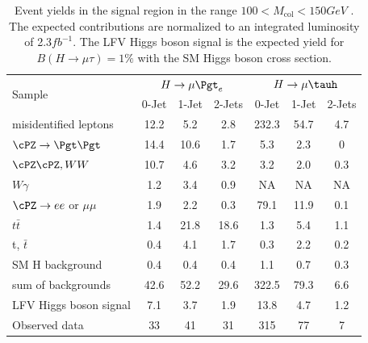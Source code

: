  \begin{table}[hbtp]
 \centering  \caption{Event yields in the signal region in the range $100 < M_\text{col} < 150GeV$ . The expected contributions are normalized to an integrated luminosity
of 2.3$fb^{-1}$. The LFV Higgs boson signal is the expected yield for $B(H \rightarrow \mu \tau)=1\%$ with the SM Higgs boson cross section.}
  \label{tab:EventYieldTable_100_to_150}
  \begin{tabular}{lccc|ccc} \hline
        \multirow{2}{*}{Sample}                                & \multicolumn{3}{c}{$H \rightarrow \mu \Pgt_{e}$}                &     \multicolumn{3}{c}{$H \rightarrow \mu \tauh$}     \\ \cline{2-7}
                                              &  0-Jet            & 1-Jet            & 2-Jets               &  0-Jet             & 1-Jet            & 2-Jets  \\ \hline
    misidentified leptons                    &  12.2  &   5.2     &  2.8 & 232.3 & 54.7 & 4.7 \\
    $ \cPZ \rightarrow \Pgt \Pgt$                    & 14.4   & 10.6      &  1.7 & 5.3   & 2.3  & 0  \\
    $ \cPZ\cPZ,WW$                       & 10.7   &  4.6      &  3.2 & 3.2   & 2.0  & 0.3\\
    $ W\gamma$                             &   1.2  &  3.4      &  0.9 &NA & NA & NA    \\
    $ \cPZ \rightarrow ee$ or $\mu \mu$          &  1.9   &  2.2      &  0.3 & 79.1 & 11.9& 0.1  \\
    $t\bar{t}     $                            &  1.4   & 21.8      & 18.6 &1.3 & 5.4 & 1.1    \\
    t, $\bar{t}$                             &  0.4   &  4.1      &  1.7 &0.3 & 2.2 & 0.2    \\
    SM H background                        &  0.4   &  0.4      &  0.4 &1.1 & 0.7 & 0.3    \\ \hline
    sum of backgrounds                       & 42.6   & 52.2      & 29.6 &322.5& 79.3 & 6.6  \\  \hline
    LFV Higgs boson signal                   &  7.1   &  3.7      &  1.9 &13.8 & 4.7 & 1.2    \\ \hline \hline
      Observed data                          &  33    &  41       &  31  & 315 & 77 & 7 \\ \hline
  \end{tabular}
\end{table}


